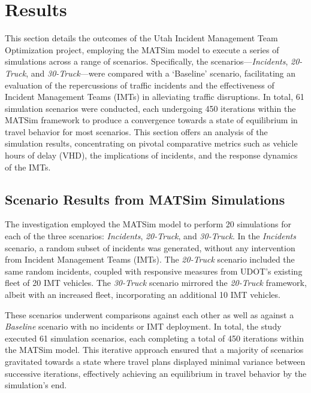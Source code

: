 \documentclass[fancy, oneside, mastersfancy, ms]{byuthesis}
\begin{document}
\hypertarget{sec-results}{%
\chapter{Results}\label{sec-results}}

This section details the outcomes of the Utah Incident Management Team
Optimization project, employing the MATSim model to execute a series of
simulations across a range of scenarios. Specifically, the
scenarios---\emph{Incidents}, \emph{20-Truck}, and
\emph{30-Truck}---were compared with a `Baseline' scenario, facilitating
an evaluation of the repercussions of traffic incidents and the
effectiveness of Incident Management Teams (IMTs) in alleviating traffic
disruptions. In total, 61 simulation scenarios were conducted, each
undergoing 450 iterations within the MATSim framework to produce a
convergence towards a state of equilibrium in travel behavior for most
scenarios. This section offers an analysis of the simulation results,
concentrating on pivotal comparative metrics such as vehicle hours of
delay (VHD), the implications of incidents, and the response dynamics of
the IMTs.

\hypertarget{scenario-results-from-matsim-simulations}{%
\section{Scenario Results from MATSim
Simulations}\label{scenario-results-from-matsim-simulations}}

The investigation employed the MATSim model to perform 20 simulations
for each of the three scenarios: \emph{Incidents}, \emph{20-Truck}, and
\emph{30-Truck}. In the \emph{Incidents} scenario, a random subset of
incidents was generated, without any intervention from Incident
Management Teams (IMTs). The \emph{20-Truck} scenario included the same
random incidents, coupled with responsive measures from UDOT's existing
fleet of 20 IMT vehicles. The \emph{30-Truck} scenario mirrored the
\emph{20-Truck} framework, albeit with an increased fleet, incorporating
an additional 10 IMT vehicles.

These scenarios underwent comparisons against each other as well as
against a \emph{Baseline} scenario with no incidents or IMT deployment.
In total, the study executed 61 simulation scenarios, each completing a
total of 450 iterations within the MATSim model. This iterative approach
ensured that a majority of scenarios gravitated towards a state where
travel plans displayed minimal variance between successive iterations,
effectively achieving an equilibrium in travel behavior by the
simulation's end.
\end{document}
